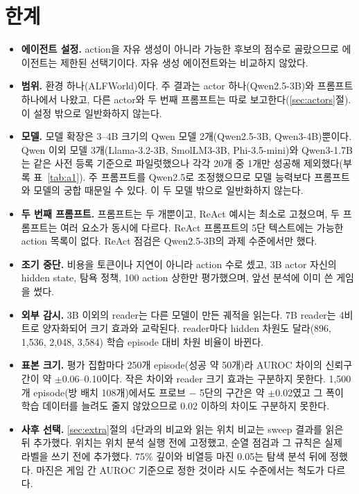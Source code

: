 \documentclass[11pt]{article}
\begin{document}
\section{한계}\label{sec:limits}
\begin{itemize}
\item \textbf{에이전트 설정.} action을 자유 생성이 아니라 가능한 후보의 점수로 골랐으므로 에이전트는 제한된 선택기이다. 자유 생성 에이전트와는 비교하지 않았다.
\item \textbf{범위.} 환경 하나(ALFWorld)이다. 주 결과는 actor 하나(Qwen2.5-3B)와 프롬프트 하나에서 나왔고, 다른 actor와 두 번째 프롬프트는 따로 보고한다(\ref{sec:actors}절). 이 설정 밖으로 일반화하지 않는다.
\item \textbf{모델.} 모델 확장은 3--4B 크기의 Qwen 모델 2개(Qwen2.5-3B, Qwen3-4B)뿐이다. Qwen 이외 모델 3개(Llama-3.2-3B, SmolLM3-3B, Phi-3.5-mini)와 Qwen3-1.7B는 같은 사전 등록 기준으로 파일럿했으나 각각 20개 중 1개만 성공해 제외했다(부록 표~\ref{tab:a1}). 주 프롬프트를 Qwen2.5로 조정했으므로 모델 능력보다 프롬프트와 모델의 궁합 때문일 수 있다. 이 두 모델 밖으로 일반화하지 않는다.
\item \textbf{두 번째 프롬프트.} 프롬프트는 두 개뿐이고, ReAct 예시는 최소로 고쳤으며, 두 프롬프트는 여러 요소가 동시에 다르다. ReAct 프롬프트의 5단 텍스트에는 가능한 action 목록이 없다. ReAct 점검은 Qwen2.5-3B의 과제 수준에서만 했다.
\item \textbf{조기 중단.} 비용을 토큰이나 지연이 아니라 action 수로 셌고, 3B actor 자신의 hidden state, 탐욕 정책, 100 action 상한만 평가했으며, 앞선 분석에 이미 쓴 게임을 썼다.
\item \textbf{외부 감시.} 3B 이외의 reader는 다른 모델이 만든 궤적을 읽는다. 7B reader는 4비트로 양자화되어 크기 효과와 교락된다. reader마다 hidden 차원도 달라(896, 1,536, 2,048, 3,584) 학습 episode 대비 차원 비율이 바뀐다.
\item \textbf{표본 크기.} 평가 집합마다 250개 episode(성공 약 50개)라 AUROC 차이의 신뢰구간이 약 $\pm$0.06--0.10이다. 작은 차이와 reader 크기 효과는 구분하지 못한다. 1,500개 episode(방 배치 108개)에서도 프로브 $-$ 5단의 구간은 약 $\pm$0.02였고 그 폭이 학습 데이터를 늘려도 줄지 않았으므로 0.02 이하의 차이도 구분하지 못한다.
\item \textbf{사후 선택.} \ref{sec:extra}절의 4단과의 비교와 읽는 위치 비교는 sweep 결과를 읽은 뒤 추가했다. 위치는 위치 분석 실행 전에 고정했고, 순열 점검과 그 규칙은 실제 라벨을 쓰기 전에 추가했다. 75\% 깊이와 비열등 마진 0.05는 탐색 분석 뒤에 정했다. 마진은 게임 간 AUROC 기준으로 정한 것이라 시도 수준에서는 척도가 다르다.

\end{itemize}
\end{document}
